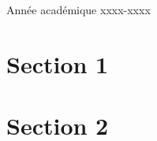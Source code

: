 \documentclass{article}
\begin{document}
\begin{titlepage}
\begin{center}
        {\large Année académique xxxx-xxxx}
        
    \end{center}
\end{titlepage}

\tableofcontents

\newpage

\section{Section 1}



\section{Section 2}


\end{document}
